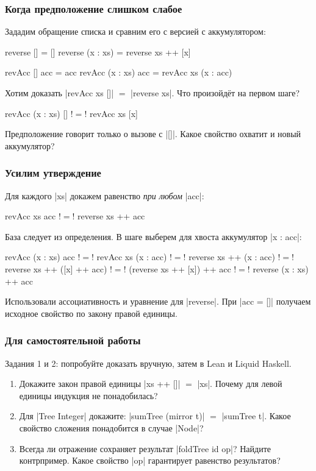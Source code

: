 \documentclass[11pt]{beamer}
\begin{document}
\begin{frame}[fragile]
  \frametitle{Когда предположение слишком слабое}
  Зададим обращение списка и сравним его с версией с аккумулятором:
  \begin{haskellsmall}
    reverse []       = []
    reverse (x : xs) = reverse xs ++ [x]

    revAcc []       acc = acc
    revAcc (x : xs) acc = revAcc xs (x : acc)
  \end{haskellsmall}
  Хотим доказать \haskinline|revAcc xs []| $=$ \haskinline|reverse xs|. Что произойдёт на первом шаге? \pause
  \begin{haskell}
      revAcc (x : xs) []
    !$=$! revAcc xs [x]
  \end{haskell}
  Предположение говорит только о вызове с \haskinline|[]|. Какое свойство охватит и новый аккумулятор?
\end{frame}

\begin{frame}[fragile]
  \frametitle{Усилим утверждение}
  Для каждого \haskinline|xs| докажем равенство \emph{при любом} \haskinline|acc|:
  \begin{haskell}
    revAcc xs acc !$=$! reverse xs ++ acc
  \end{haskell}
  База следует из определения. В шаге выберем для хвоста аккумулятор \haskinline|x : acc|: \pause
  \begin{haskellsmall}
      revAcc (x : xs) acc
    !$=$! revAcc xs (x : acc)
    !$=$! reverse xs ++ (x : acc)
    !$=$! reverse xs ++ ([x] ++ acc)
    !$=$! (reverse xs ++ [x]) ++ acc
    !$=$! reverse (x : xs) ++ acc
  \end{haskellsmall}
  Использовали ассоциативность и уравнение для \haskinline|reverse|. При \haskinline|acc = []| получаем исходное свойство по закону правой единицы.
\end{frame}

\begin{frame}[fragile]
  \frametitle{Для самостоятельной работы}
  Задания 1 и 2: попробуйте доказать вручную, затем в Lean и Liquid Haskell.
  \begin{enumerate}
    \item Докажите закон правой единицы \haskinline|xs ++ []| $=$ \haskinline|xs|. Почему для левой единицы индукция не понадобилась?
    \item Для \haskinline|Tree Integer| докажите: \haskinline|sumTree (mirror t)| $=$ \haskinline|sumTree t|. Какое свойство сложения понадобится в случае \haskinline|Node|?
    \item Всегда ли отражение сохраняет результат \haskinline|foldTree id op|? Найдите контрпример. Какое свойство \haskinline|op| гарантирует равенство результатов?
  \end{enumerate}
\end{frame}
\end{document}

